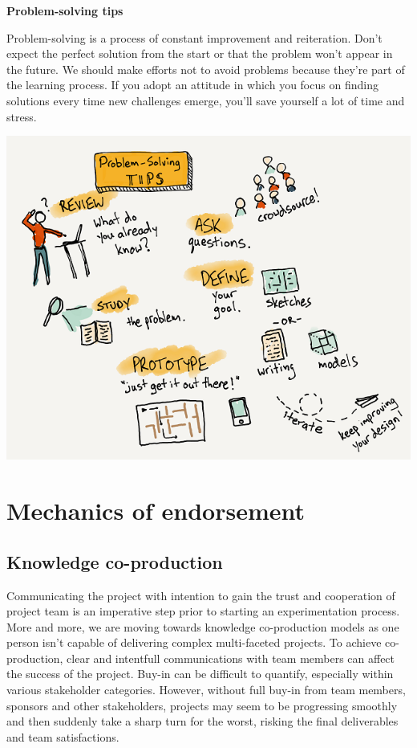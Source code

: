 \documentclass[]{book}
\begin{document}
\textbf{Problem-solving tips}

Problem-solving is a process of constant improvement and reiteration. Don't expect the perfect solution from the start or that the problem won't appear in the future. We should make efforts not to avoid problems because they're part of the learning process. If you adopt an attitude in which you focus on finding solutions every time new challenges emerge, you'll save yourself a lot of time and stress.

\includegraphics{fig/tips.png}

\hypertarget{mechanics-of-endorsement}{%
\chapter{Mechanics of endorsement}\label{mechanics-of-endorsement}}

\hypertarget{knowledge-co-production}{%
\section{Knowledge co-production}\label{knowledge-co-production}}

Communicating the project with intention to gain the trust and cooperation of project team is an imperative step prior to starting an experimentation process. More and more, we are moving towards knowledge co-production models as one person isn't capable of delivering complex multi-faceted projects. To achieve co-production, clear and intentfull communications with team members can affect the success of the project. Buy-in can be difficult to quantify, especially within various stakeholder categories. However, without full buy-in from team members, sponsors and other stakeholders, projects may seem to be progressing smoothly and then suddenly take a sharp turn for the worst, risking the final deliverables and team satisfactions.
\end{document}
